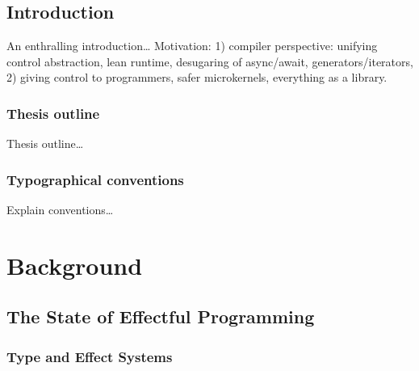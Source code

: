 \documentclass[11pt,phd,lfcs,twoside,openright,logo,leftchapter,normalheadings]{infthesis}
\begin{document}
\begin{preliminary}
\dedication{\emph{To be or to do}}


\setcounter{secnumdepth}{2} %
\setcounter{tocdepth}{1} %
\tableofcontents

\end{preliminary}


\chapter{Introduction}
\label{ch:introduction}
An enthralling introduction\dots
%
Motivation: 1) compiler perspective: unifying control abstraction,
lean runtime, desugaring of async/await, generators/iterators, 2)
giving control to programmers, safer microkernels, everything as a
library.

\section{Thesis outline}
Thesis outline\dots

\section{Typographical conventions}
Explain conventions\dots

\part{Background}
\label{p:background}

\chapter{The State of Effectful Programming}
\label{ch:related-work}

\section{Type and Effect Systems}
\end{document}
